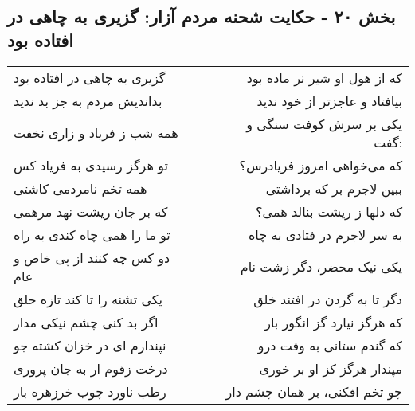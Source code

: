 \begin{center}
\section*{بخش ۲۰ - حکایت شحنه مردم آزار: گزیری به چاهی در افتاده بود}
\label{sec:020}
\begin{longtable}{l p{0.5cm} r}
گزیری به چاهی در افتاده بود
&&
که از هول او شیر نر ماده بود
\\
بداندیش مردم به جز بد ندید
&&
بیافتاد و عاجزتر از خود ندید
\\
همه شب ز فریاد و زاری نخفت
&&
یکی بر سرش کوفت سنگی و گفت:
\\
تو هرگز رسیدی به فریاد کس
&&
که می‌خواهی امروز فریادرس؟
\\
همه تخم نامردمی کاشتی
&&
ببین لاجرم بر که برداشتی
\\
که بر جان ریشت نهد مرهمی
&&
که دلها ز ریشت بنالد همی؟
\\
تو ما را همی چاه کندی به راه
&&
به سر لاجرم در فتادی به چاه
\\
دو کس چه کنند از پی خاص و عام
&&
یکی نیک محضر، دگر زشت نام
\\
یکی تشنه را تا کند تازه حلق
&&
دگر تا به گردن در افتند خلق
\\
اگر بد کنی چشم نیکی مدار
&&
که هرگز نیارد گز انگور بار
\\
نپندارم ای در خزان کشته جو
&&
که گندم ستانی به وقت درو
\\
درخت زقوم ار به جان پروری
&&
مپندار هرگز کز او بر خوری
\\
رطب ناورد چوب خرزهره بار
&&
چو تخم افکنی، بر همان چشم دار
\\
\end{longtable}
\end{center}
